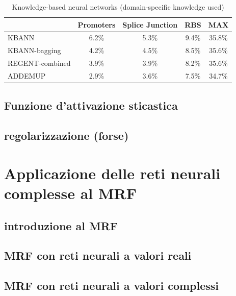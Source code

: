 \documentclass[a4paper,10pt]{article}
\begin{document}
  \begin{table}[h]\caption{Knowledge-based neural networks (domain-specific knowledge used)} \label{KnowledgeTab}
   \centering
   \begin{tabular}[h]{|l|c|c|c|c|}
    \hline
       & Promoters & Splice Junction & RBS & MAX \\ \hline
    KBANN & 6.2\% & 5.3\% & 9.4\% & 35.8\% \\ 
    KBANN-bagging & 4.2\% & 4.5\% & 8.5\% & 35.6\% \\
    REGENT-combined & 3.9\% & 3.9\% & 8.2\% & 35.6\% \\
    ADDEMUP & 2.9\% & 3.6\% & 7.5\% & 34.7\% \\ \hline
   \end{tabular}
  \end{table}







 \subsection{Funzione d'attivazione sticastica}
 
 \subsection{regolarizzazione (forse)}
 
 \section{Applicazione delle reti neurali complesse al MRF}
 \subsection{introduzione al MRF}
 
 \subsection{MRF con reti neurali a valori reali}
 
 \subsection{MRF con reti neurali a valori complessi}
 
 
\end{document}
